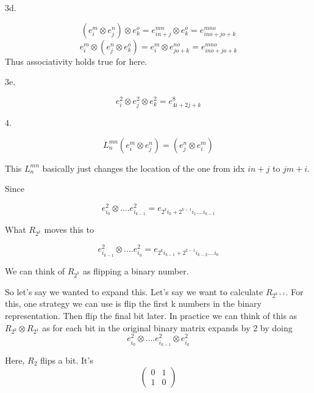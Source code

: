 \documentclass{article}
\begin{document}
	3d.
	
	\begin{equation}
		(e_i^m \otimes e_j^n) \otimes e_k^o = e_{in+j}^{mn} \otimes e_k^o = e_{ino+jo+k}^{mno}
	\end{equation}
	\begin{equation}
		e_i^m \otimes (e_j^n \otimes e_k^o) = e_i^m \otimes e_{jo+k}^{no} = e_{ino+jo + k}^{mno}
	\end{equation}
	Thus associativity holds true for here.
	
	3e.
	
	\begin{equation}
		e_i^2 \otimes e_j^2 \otimes e_k^2 = e_{4i+2j+k}^{8}
	\end{equation}

	4.
	
	\begin{equation}
		L_n^{mn}(e_i^m \otimes e_j^n)=(e_j^n \otimes e_i^m)
	\end{equation}

	This $L^{mn}_n$ basically just changes the location of the one from idx $in+j$ to $jm+i$.
	
	Since
	
	\begin{equation}
		e_{i_0}^2 \otimes ....e_{i_{k-1}}^2=e_{2^ki_0+2^{k-1}i_1....i_{k-1}}
	\end{equation}
	
	What $R_{2^k}$ moves this to
	
	\begin{equation}
		e_{i_{k-1}}^2 \otimes ....e_{i_0}^2=e_{2^ki_{k-1}+2^{k-1}i_{k-2}....i_0}
	\end{equation}

	We can think of $R_{2^k}$ as flipping a binary number.
	
	So let's say we wanted to expand this. Let's say we want to calculate $R_{2^{k+1}}$. For this, one strategy we can use is flip the first k numbers in the binary representation. Then flip the final bit later. In practice we can think of this as
	$R_{2^k} \otimes R_{2^1}$ as for each bit in the original binary matrix expands by 2 by doing
	\begin{equation}
		e_{i_0}^2 \otimes ....e_{i_{k-1}}^2 \otimes e_{i_k}^2
	\end{equation}
	
	Here, $R_2$ flips a bit. It's
	\begin{equation}
		\begin{pmatrix}
			0 & 1 \\
			1 & 0
		\end{pmatrix}
	\end{equation}
	
\end{document}
